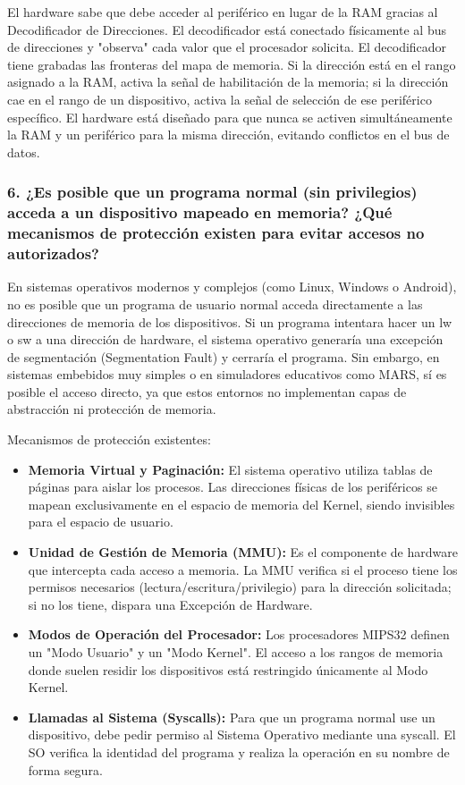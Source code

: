 \documentclass[12pt,a4paper]{article}
\begin{document}
El hardware sabe que debe acceder al periférico en lugar de la RAM gracias al Decodificador de Direcciones. El decodificador está conectado físicamente al bus de direcciones y "observa" cada valor que el procesador solicita. El decodificador tiene grabadas las fronteras del mapa de memoria. Si la dirección está en el rango asignado a la RAM, activa la señal de habilitación de la memoria; si la dirección cae en el rango de un dispositivo, activa la señal de selección de ese periférico específico. El hardware está diseñado para que nunca se activen simultáneamente la RAM y un periférico para la misma dirección, evitando conflictos en el bus de datos.

\subsubsection{6. ¿Es posible que un programa normal (sin privilegios) acceda a un dispositivo mapeado en memoria? ¿Qué mecanismos de protección existen para evitar accesos no autorizados?}

En sistemas operativos modernos y complejos (como Linux, Windows o Android), no es posible que un programa de usuario normal acceda directamente a las direcciones de memoria de los dispositivos. Si un programa intentara hacer un lw o sw a una dirección de hardware, el sistema operativo generaría una excepción de segmentación (Segmentation Fault) y cerraría el programa. Sin embargo, en sistemas embebidos muy simples o en simuladores educativos como MARS, sí es posible el acceso directo, ya que estos entornos no implementan capas de abstracción ni protección de memoria.

Mecanismos de protección existentes:
\begin{itemize}
    \item \textbf{Memoria Virtual y Paginación:} El sistema operativo utiliza tablas de páginas para aislar los procesos. Las direcciones físicas de los periféricos se mapean exclusivamente en el espacio de memoria del Kernel, siendo invisibles para el espacio de usuario.
    \item \textbf{Unidad de Gestión de Memoria (MMU):} Es el componente de hardware que intercepta cada acceso a memoria. La MMU verifica si el proceso tiene los permisos necesarios (lectura/escritura/privilegio) para la dirección solicitada; si no los tiene, dispara una Excepción de Hardware.
    \item \textbf{Modos de Operación del Procesador:} Los procesadores MIPS32 definen un "Modo Usuario" y un "Modo Kernel". El acceso a los rangos de memoria donde suelen residir los dispositivos está restringido únicamente al Modo Kernel.
    \item \textbf{Llamadas al Sistema (Syscalls):} Para que un programa normal use un dispositivo, debe pedir permiso al Sistema Operativo mediante una syscall. El SO verifica la identidad del programa y realiza la operación en su nombre de forma segura.
\end{itemize}
\end{document}
